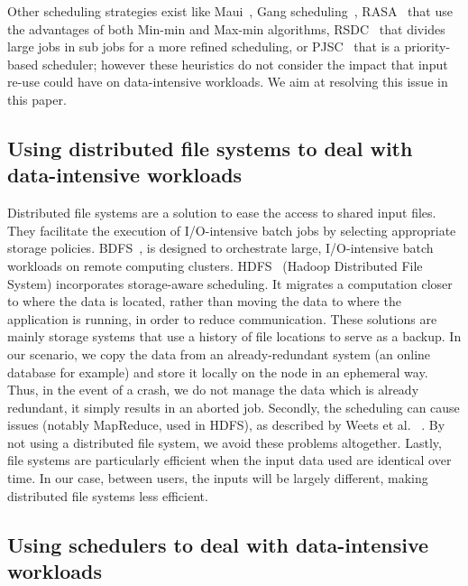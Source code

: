 \documentclass[conference]{IEEEtran}
\begin{document}
Other scheduling strategies exist like 
Maui~\cite{Maui_Scheduler}, Gang scheduling~\cite{gang_scheduling}, 
RASA~\cite{rasa} that use the advantages of both Min-min and Max-min algorithms,
RSDC~\cite{rsdc} that divides large jobs in sub jobs for a more refined scheduling,
or PJSC~\cite{pjsc} that is a priority-based scheduler; 
however these heuristics do not consider the impact that
input re-use could have on data-intensive workloads.
We aim at resolving this issue in this paper.

\subsection{Using distributed file systems to deal with data-intensive workloads}

Distributed file systems are a solution to ease the access to 
shared input files.
They facilitate the execution of I/O-intensive batch
jobs by selecting appropriate storage policies.
BDFS~\cite{Explicit_Control_in_a_Batch-Aware_Distributed_File_System},
is designed to orchestrate large, I/O-intensive batch workloads on remote computing clusters.
HDFS~\cite{hdfs} (Hadoop Distributed File System)
incorporates storage-aware scheduling. 
It migrates a computation closer to where the data is
located, rather than moving the data to where the application is
running, in order to reduce communication.
These solutions are mainly storage systems that use a history of file locations to serve as a backup.
In our scenario, we copy the data from an already-redundant system (an online database for example)
and store it locally on the node in an ephemeral way.
Thus, in the event of a crash, we do not manage the data which is already redundant, it simply results in an aborted job.
Secondly, the scheduling can cause issues (notably MapReduce, used in HDFS), as described by Weets et al.
~\cite{issue_with_hdfs}.
By not using a distributed file system, we avoid these problems altogether.
Lastly, file systems are particularly efficient when the input data used are identical over time.
In our case, between users, the inputs will be largely different, making distributed file systems less efficient.

\subsection{Using schedulers to deal with data-intensive workloads}
\end{document}
